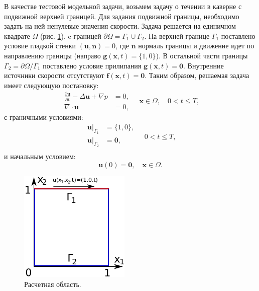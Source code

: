 \documentclass[12pt]{article}
\begin{document}
В качестве тестовой модельной задачи, возьмем задачу о течении в каверне с подвижной верхней границей. 
Для задания подвижной границы, необходимо задать на ней ненулевые значения скорости.
Задача решается на единичном квадрате $\Omega$ (рис. \ref{fg:cavity}), c границей $\partial \Omega=\Gamma_1 \cup \Gamma_2$. На верхней границе $\Gamma_1$ поставлено условие гладкой стенки $({\bm u}, {\bm n}) = 0$, где ${\bm n}$ нормаль границы и движение идет по направлению границы (направо ${\bm g}({\bm x},t)=\{1,0\}$). 
В остальной части границы $\Gamma_2=\partial \Omega / \Gamma_1$ поставлено условие прилипания ${\bm g}({\bm x}, t)={\bm 0}$. Внутренние источники скорости отсутствуют ${\bm f}({\bm x}, t)={\bm 0}$. Таким образом, решаемая задача имеет следующую постановку:
\begin{equation}
\begin{aligned}
\frac{\partial {\bm u}}{\partial t} -\Delta {\bm u} + \nabla p &= 0, \\
\nabla\cdot{\bm u} &= 0, 
\end{aligned}
\quad {\bm x} \in \Omega, \quad 0<t \leq T,
\label{eq:scheme-main}
\end{equation} 
с граничными условиями:
\begin{equation}
\begin{split}
{\bm u |_{\Gamma_1}} &= \{1, 0\}, \\
{\bm u |_{\Gamma_2}} &= {\bm 0},  \\
\end{split}
\quad 0<t \leq T,
\label{eq:scheme-boundary}
\end{equation} 
и начальным условием:
\begin{equation}
{\bm u(0)} = {\bm 0}, \quad {\bm x} \in \Omega.
\label{eq:scheme-start}
\end{equation}

\begin{figure}
	\begin{center}
		\includegraphics[width=200px]{pics/cavity400}
		\caption{Расчетная область.}
		\label{fg:cavity}
	\end{center}
\end{figure}
\end{document}
